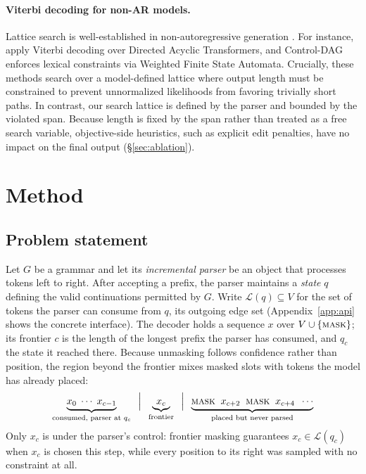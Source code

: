 \documentclass{article}
\begin{document}
\paragraph{Viterbi decoding for non-AR models.}
Lattice search is well-established in non-autoregressive generation \citep{deng2021sequence}. For instance, \citet{shao2022viterbi} apply Viterbi decoding over Directed Acyclic Transformers, and Control-DAG \citep{chen2024controldag} enforces lexical constraints via Weighted Finite State Automata. Crucially, these methods search over a model-defined lattice where output length must be constrained to prevent unnormalized likelihoods from favoring trivially short paths. In contrast, our search lattice is defined by the parser and bounded by the violated span. Because length is fixed by the span rather than treated as a free search variable, objective-side heuristics, such as explicit edit penalties, have no impact on the final output (\S\ref{sec:ablation}).

\section{Method}
\label{sec:method}

\subsection{Problem statement}
\label{sec:problem}

Let $G$ be a grammar and let its \emph{incremental parser} be an object that processes tokens left to right. After accepting a prefix, the parser maintains a \emph{state} $q$ defining the valid continuations permitted by $G$. Write
$\mathcal{L}(q)\subseteq V$ for the set of tokens the parser can consume from
$q$, its outgoing edge set (Appendix~\ref{app:api} shows the concrete interface). The decoder holds a sequence $x$ over
$V\cup\{\textsc{mask}\}$; its frontier $c$ is the length of the longest
prefix the parser has consumed, and $q_c$ the state it reached there. 
Because unmasking follows confidence rather than position, the region beyond the frontier mixes masked slots with tokens the model has already placed:
\[
\underbrace{x_0\;\cdots\;x_{c-1}}_{\text{consumed, parser at }q_c}
\;\;\Big|\;\;
\underbrace{x_c}_{\text{frontier}}
\;\;\Big|\;\;
\underbrace{\textsc{mask}\;\;x_{c+2}\;\;\textsc{mask}\;\;x_{c+4}\;\;\cdots}_{\text{placed but never parsed}}
\]
Only $x_c$ is under the parser's control: frontier masking guarantees
$x_c\in\mathcal{L}(q_c)$ when $x_c$ is chosen this step, while every position to
its right was sampled with no constraint at all.
\end{document}
